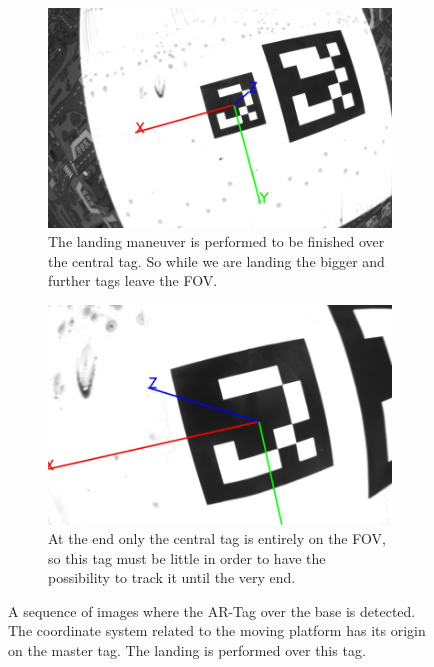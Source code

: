 \begin{figure}[!htbp]
    \begin{subfigure}[b]{0.45\textwidth}
        \includegraphics[width=\textwidth]{img/frame4.jpg}
        \caption{The landing maneuver is performed to be finished over the central tag. So while we are landing the bigger and further tags leave the FOV.  }
        \label{fig:five}
   \end{subfigure}\hfill
    \begin{subfigure}[b]{0.45\textwidth}
        \includegraphics[width=\textwidth]{img/frame5.jpg}
        \caption{At the end only the central tag is entirely on the FOV, so this tag must be little in order to have the possibility to track it until the very end.}
        \label{fig:six}
   \end{subfigure}
   
  \caption{A sequence of images where the AR-Tag over the base is detected. The coordinate system related to the moving platform has its origin on the master tag. The landing is performed over this tag.}
  \label{fig:arsys}
\end{figure} 


